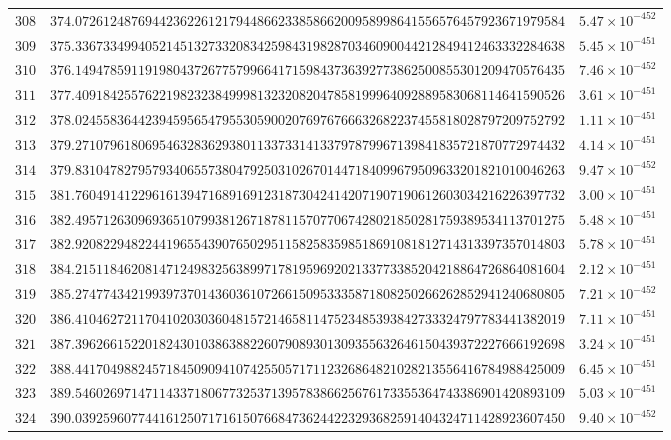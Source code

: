 \documentclass[12pt,reqno]{amsart}
\theoremstyle{remark}
\begin{document}
\begin{longtable}{clc}
$308$ & $374.0726124876944236226121794486623385866200958998641556576457923671979584$ & $5.47\times 10^{-452}$ \\
$309$ & $375.3367334994052145132733208342598431982870346090044212849412463332284638$ & $5.45\times 10^{-451}$ \\
$310$ & $376.1494785911919804372677579966417159843736392773862500855301209470576435$ & $7.46\times 10^{-452}$ \\
$311$ & $377.4091842557622198232384999813232082047858199964092889583068114641590526$ & $3.61\times 10^{-451}$ \\
$312$ & $378.0245583644239459565479553059002076976766632682237455818028797209752792$ & $1.11\times 10^{-451}$ \\
$313$ & $379.2710796180695463283629380113373314133797879967139841835721870772974432$ & $4.14\times 10^{-451}$ \\
$314$ & $379.8310478279579340655738047925031026701447184099679509633201821010046263$ & $9.47\times 10^{-452}$ \\
$315$ & $381.7604914122961613947168916912318730424142071907190612603034216226397732$ & $3.00\times 10^{-451}$ \\
$316$ & $382.4957126309693651079938126718781157077067428021850281759389534113701275$ & $5.48\times 10^{-451}$ \\
$317$ & $382.9208229482244196554390765029511582583598518691081812714313397357014803$ & $5.78\times 10^{-451}$ \\
$318$ & $384.2151184620814712498325638997178195969202133773385204218864726864081604$ & $2.12\times 10^{-451}$ \\
$319$ & $385.2747743421993973701436036107266150953335871808250266262852941240680805$ & $7.21\times 10^{-452}$ \\
$320$ & $386.4104627211704102030360481572146581147523485393842733324797783441382019$ & $7.11\times 10^{-451}$ \\
$321$ & $387.3962661522018243010386388226079089301309355632646150439372227666192698$ & $3.24\times 10^{-451}$ \\
$322$ & $388.4417049882457184509094107425505717112326864821028213556416784988425009$ & $6.45\times 10^{-451}$ \\
$323$ & $389.5460269714711433718067732537139578386625676173355364743386901420893109$ & $5.03\times 10^{-451}$ \\
$324$ & $390.0392596077441612507171615076684736244223293682591404324711428923607450$ & $9.40\times 10^{-452}$ \\

\end{longtable}
\end{document}

